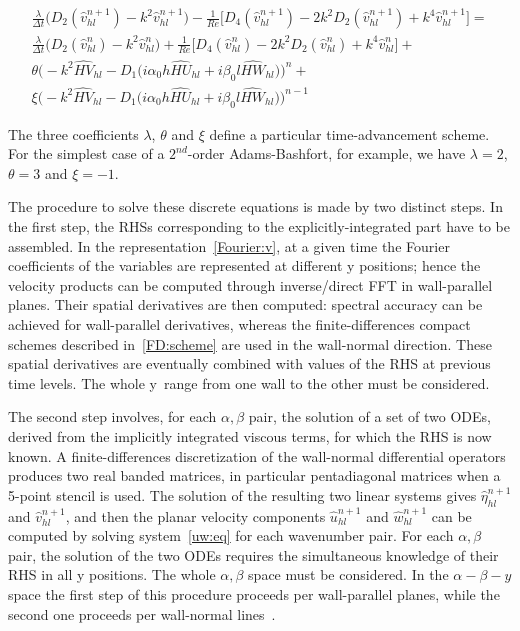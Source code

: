\begin{multline}
\frac{\lambda}{\Delta t} \big( D_{2} (\hat{v}_{hl}^{n+1}) - k^{2} \hat{v}_{hl}^{n+1} \big) -\frac{1}{Re} \big[ D_{4} (\hat{v}_{hl}^{n+1}) -2 k^{2} D_{2} (\hat{v}_{hl}^{n+1}) + k^{4} \hat{v}_{hl}^{n+1} \big] =\\
\frac{\lambda}{\Delta t} \big( D_{2}(\hat{v}_{hl}^{n}) - k^{2}\hat{v}_{hl}^{n} \big) + \frac{1}{Re} \big[ D_{4} (\hat{v}_{hl}^{n}) -2 k^{2} D_{2} (\hat{v}_{hl}^{n}) + k^{4} \hat{v}_{hl}^{n} \big]+ \\
\theta \bigg( -k^{2} \widehat{HV}_{hl} -D_{1} \big( i\alpha_{0} h \widehat{HU}_{hl} + i\beta_{0} l \widehat{HW}_{hl} \big)  \bigg)^{n} + \\
\xi \bigg( -k^{2} \widehat{HV}_{hl} -D_{1} \big( i\alpha_{0}h\widehat{HU}_{hl} + i\beta_{0}l \widehat{HW}_{hl} \big) \bigg)^{n-1}
\end{multline}

The three coefficients $\lambda$, $\theta$ and $\xi$ define a particular time-advancement scheme. For the simplest case of a $2^{nd}$-order Adams-Bashfort, for example, we have $\lambda= 2$, $\theta = 3$ and $\xi = -1$.\par
The procedure to solve these discrete equations is made by two distinct steps. In the first step, the RHSs corresponding to the explicitly-integrated  part have to be assembled. In the representation~\ref{Fourier:v}, at a given time the Fourier coefficients of the variables are represented at different y positions; hence the velocity products can be computed through inverse/direct FFT in wall-parallel planes. Their spatial derivatives are then computed: spectral accuracy can be achieved for wall-parallel derivatives, whereas the finite-differences compact schemes described in~\ref{FD:scheme} are used in the wall-normal direction. These spatial derivatives are eventually combined with values of the RHS at previous time levels. The whole y~range from one wall to the other must be considered. 
\par
The second step involves, for each $\alpha,\beta$ pair, the solution of a set of two ODEs, derived from the implicitly integrated viscous terms, for which the RHS is now known. A finite-differences discretization of the wall-normal differential operators produces two real banded matrices, in particular pentadiagonal matrices when a 5-point stencil is used. The solution of the resulting two linear systems gives $\hat{\eta}_{hl}^{n+1}$ and $\hat{v}_{hl}^{n+1}$, and then the planar velocity components $\hat{u}_{hl}^{n+1}$ and $\hat{w}_{hl}^{n+1}$ can be computed by solving system~\ref{uw:eq} for each wavenumber pair. For each $\alpha,\beta$ pair, the solution of the two ODEs requires the simultaneous knowledge of their RHS in all y positions. The whole $\alpha,\beta$ space must be considered. In the $\alpha - \beta - y$ space the first step of this procedure proceeds per wall-parallel planes, while the second one proceeds per wall-normal lines~\cite{ns:quadrio}.

